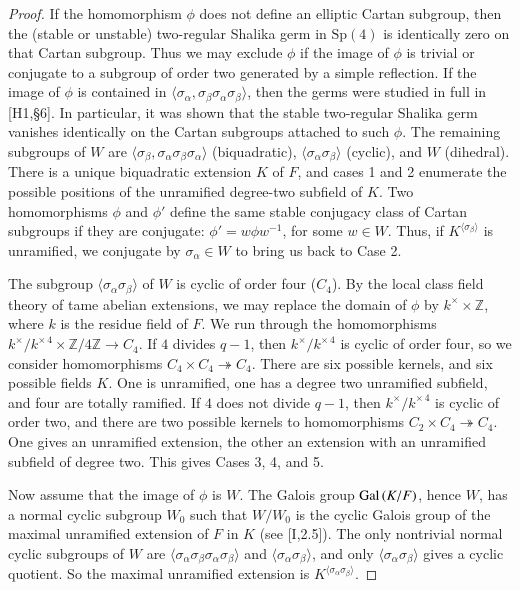 \documentclass{amsart}
\newcommand\Z{{\mathbb Z}}
\newcommand\Gal{\hbox{Gal\,}}
\begin{document}
\bigskip
\noindent
\begin{proof}    If the homomorphism $\phi$ does not define an elliptic
Cartan subgroup, then the (stable or unstable)
two-regular Shalika germ in $\text{Sp}(4)$ is identically zero on that
Cartan subgroup.  Thus we may exclude $\phi$ if the image of $\phi$
is trivial or conjugate to a subgroup of order two generated by
a simple reflection.  If the image of $\phi$ is contained in
$\langle\sigma_\alpha,\sigma_\beta\sigma_\alpha\sigma_\beta\rangle$,
then the germs were studied in full in [H1,\S6].  In particular,
it was shown that the stable two-regular Shalika germ vanishes
identically on the Cartan subgroups attached to such $\phi$.
The remaining subgroups of $W$ are $\langle\sigma_\beta,
\sigma_\alpha\sigma_\beta\sigma_\alpha\rangle$ (biquadratic),
$\langle\sigma_\alpha\sigma_\beta\rangle$ (cyclic), and $W$ (dihedral).
There is a unique biquadratic extension
$K$ of $F$, and cases 1 and 2 enumerate the possible positions
of the unramified degree-two subfield of $K$.  Two homomorphisms
$\phi$ and $\phi'$ define the same stable conjugacy class of
Cartan subgroups if they are conjugate: $\phi'=w\phi w^{-1}$, for
some $w\in W$.  Thus, if $K^{\langle\sigma_\beta
\rangle}$ is unramified, we conjugate by $\sigma_\alpha\in W$ to bring
us back to Case 2.

The subgroup $\langle\sigma_\alpha\sigma_\beta\rangle$
of $W$ is cyclic of order four ($C_4$).
By the local class field theory of tame abelian extensions,
we may replace the domain of $\phi$ by  
$k^\times \times\Z$, where $k$ is the residue field
of $F$.  
  We run through the homomorphisms
$k^\times/k^{\times\,4}\times \Z/4\Z \to C_4$.  If $4$ divides $q-1$, then
$k^\times/k^{\times\,4}$ is cyclic of order four, so we consider
homomorphisms $C_4\times C_4\twoheadrightarrow C_4$.  There are
six possible kernels, and six possible fields $K$.  One is unramified,
one has a degree two unramified subfield, and four are totally
ramified.  If $4$ does not divide $q-1$, then $k^\times/k^{\times\,4}$
is cyclic of order two, and there are two possible kernels to
homomorphisms $C_2\times C_4\twoheadrightarrow C_4$.  One
gives an unramified extension, the other an extension with
an unramified subfield
of degree two.  This gives Cases 3, 4, and 5.

Now assume that the image of $\phi$ is $W$.  The Galois group
$\Gal(K/F)$, hence $W$, has a normal cyclic subgroup $W_0$
such that $W/W_0$ is the cyclic Galois group of the maximal
unramified extension of $F$ in $K$ (see [I,2.5]).  The only nontrivial
normal
cyclic subgroups of $W$ are $\langle\sigma_\alpha\sigma_\beta
\sigma_\alpha\sigma_\beta\rangle$ and 
$\langle\sigma_\alpha\sigma_\beta\rangle$, 
and only $\langle\sigma_\alpha\sigma_\beta
\rangle$ gives a cyclic quotient.  So the maximal unramified 
extension is $K^{\langle\sigma_\alpha\sigma_\beta\rangle}$.


\end{proof}
\end{document}
